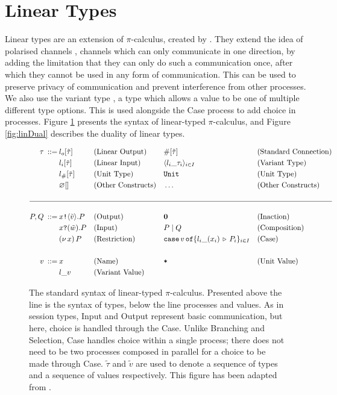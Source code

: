 \documentclass{l4proj}
\begin{document}
\section{Linear Types}
\label{bgLinTypes}

Linear types are an extension of $\pi$-calculus, created by \citet{Kobayashi:1999:LP:330249.330251}. They extend the idea of polarised channels \citep{OderskyPolarized, pierce_sangiorgi_1996}, channels which can only communicate in one direction, by adding the limitation that they can only do such a communication once, after which they cannot be used in any form of communication. This can be used to preserve privacy of communication and prevent interference from other processes. We also use the variant type \citep{SANGIORGI199834}, a type which allows a value to be one of multiple different type options. This is used alongside the Case process to add choice in processes. Figure \ref{fig:linSyntax} presents the syntax of linear-typed $\pi$-calculus, and Figure \ref{fig:linDual} describes the duality of linear types.

\begin{figure}[H]
\begin{align*}
\tau\:::=\:&l_{o}[\tilde{\tau}] & &\text{(Linear Output)} & &\#[\tilde{\tau}] & &\text{(Standard Connection)} \\
&l_{i}[\tilde{\tau}] & &\text{(Linear Input)} & &\langle l_{i}\_\tau_{i} \rangle _{i \in I} & &\text{(Variant Type)} \\
&l_{\#}[\tilde{\tau}] & &\text{(Unit Type)} & &\texttt{Unit} & &\text{(Unit Type)} \\
&\varnothing[] & &\text{(Other Constructs)} & &\dots & &\text{(Other Constructs)} \\
{} \\
\hline \\
P, Q\:::=\:&x\texttt{!} \langle \tilde{v} \rangle .P & &\text{(Output)} & & \textbf{0} & &\text{(Inaction)} \\
&x\texttt{?}(\tilde{w}).P & &\text{(Input)} & & P \mid Q & &\text{(Composition)} \\
&(\nu\,x)\,P & &\text{(Restriction)} & &\texttt{case}\,v\,\texttt{of}\{l_{i}\_(x_{i})\,\triangleright\,P_{i}\}_{i \in I} & &\text{(Case)}  \\
{} \\
v\:::=\:&x & &\text{(Name)} & & \texttt{*} & &\text{(Unit Value)} \\
&l\_v & &\text{(Variant Value)}
\end{align*}
\caption{The standard syntax of linear-typed $\pi$-calculus. Presented above the line is the syntax of types, below the line processes and values. As in session types, Input and Output represent basic communication, but here, choice is handled through the Case. Unlike Branching and Selection, Case handles choice within a single process; there does not need to be two processes composed in parallel for a choice to be made through Case. $\tilde{\tau}$ and $\tilde{v}$ are used to denote a sequence of types and a sequence of values respectively. This figure has been adapted from \citet{DARDHA2017253}.}
\label{fig:linSyntax}
\end{figure}
\end{document}
